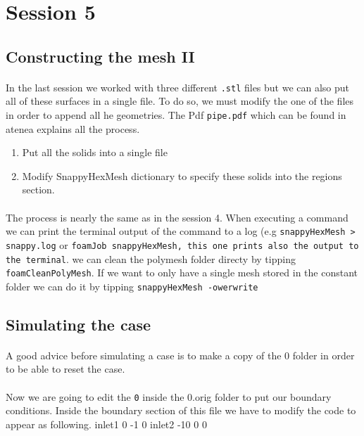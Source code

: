 \lstset{language=C}
\section{Session 5}
\subsection{Constructing the mesh II}
\paragraph{}In the last session we worked with three different \texttt{.stl} files but we can also put all of these surfaces in a single file. To do so, we must modify the one of the files in order to append all he geometries. The Pdf \texttt{pipe.pdf} which can be found in atenea explains all the process.
\begin{enumerate}
	\item Put all the solids into a single file
	\item Modify SnappyHexMesh dictionary to specify these solids 	into the regions section.
\end{enumerate}
\paragraph{}The process is nearly the same as in the session 4. When executing a command we can print the terminal output of the command to a log (e.g \texttt{snappyHexMesh > snappy.log} or \texttt{foamJob snappyHexMesh, this one prints also the output to the terminal}. we can clean the polymesh folder directy by tipping \texttt{foamCleanPolyMesh}. If we want to only have a single mesh stored in the constant folder we can do it by tipping \texttt{snappyHexMesh -owerwrite} 

\subsection{Simulating the case}
\paragraph{}A good advice before simulating a case is to make a copy of the 0 folder in order to be able to reset the case.

\paragraph{}Now we are going to edit the \texttt{0} inside the 0.orig folder to put our boundary conditions. Inside the boundary section of this file we have to modify the code to appear as following.
inlet1 0 -1 0
inlet2 -10 0 0

